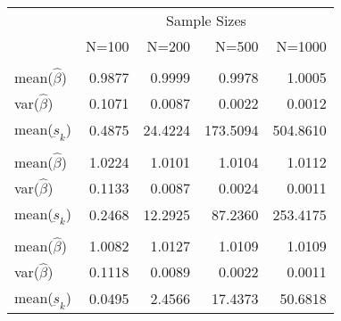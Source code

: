 
\begin{tabular}{lrrrr}
\toprule
\multicolumn{1}{c}{ } & \multicolumn{4}{c}{Sample Sizes} \\
\cmidrule(l{3pt}r{3pt}){2-5}
  & N=100 & N=200 & N=500 & N=1000\\
\midrule
\addlinespace[0.3em]
\multicolumn{5}{l}{\textbf{$ \rho = 0 $  }}\\
\hspace{1em}mean($\hat{\beta}$) & 0.9877 & 0.9999 & 0.9978 & 1.0005\\
\hspace{1em}var($\hat{\beta}$) & 0.1071 & 0.0087 & 0.0022 & 0.0012\\
\hspace{1em}mean($\underbar{s}_k$) & 0.4875 & 24.4224 & 173.5094 & 504.8610\\
\addlinespace[0.3em]
\multicolumn{5}{l}{\textbf{$ \rho = 0.5 $}}\\
\hspace{1em}mean($\hat{\beta}$) & 1.0224 & 1.0101 & 1.0104 & 1.0112\\
\hspace{1em}var($\hat{\beta}$) & 0.1133 & 0.0087 & 0.0024 & 0.0011\\
\hspace{1em}mean($\underbar{s}_k$) & 0.2468 & 12.2925 & 87.2360 & 253.4175\\
\addlinespace[0.3em]
\multicolumn{5}{l}{\textbf{$ \rho = 0.9 $}}\\
\hspace{1em}mean($\hat{\beta}$) & 1.0082 & 1.0127 & 1.0109 & 1.0109\\
\hspace{1em}var($\hat{\beta}$) & 0.1118 & 0.0089 & 0.0022 & 0.0011\\
\hspace{1em}mean($\underbar{s}_k$) & 0.0495 & 2.4566 & 17.4373 & 50.6818\\
\bottomrule
\end{tabular}
